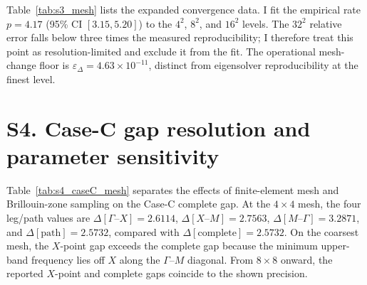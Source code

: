 \documentclass[pdflatex,sn-basic,Numbered]{sn-jnl}
\begin{document}
\begin{table}[htbp]
\caption{Expanded mesh-convergence data, including successive changes and eigensolver reproducibility}
\label{tab:s3_mesh}

\end{table}

Table~\ref{tab:s3_mesh} lists the expanded convergence data. I fit the empirical rate $p=4.17$ (95\% CI $[3.15,5.20]$) to the $4^2$, $8^2$, and $16^2$ levels. The $32^2$ relative error falls below three times the measured reproducibility; I therefore treat this point as resolution-limited and exclude it from the fit. The operational mesh-change floor is $\varepsilon_\Delta=4.63\times10^{-11}$, distinct from eigensolver reproducibility at the finest level.

\section*{S4. Case-C gap resolution and parameter sensitivity}
Table~\ref{tab:s4_caseC_mesh} separates the effects of finite-element mesh and Brillouin-zone sampling on the Case-C complete gap. At the $4\times4$ mesh, the four leg/path values are $\Delta[\Gamma\text{--}X]=2.6114$, $\Delta[X\text{--}M]=2.7563$, $\Delta[M\text{--}\Gamma]=3.2871$, and $\Delta[\mathrm{path}]=2.5732$, compared with $\Delta[\mathrm{complete}]=2.5732$. On the coarsest mesh, the $X$-point gap exceeds the complete gap because the minimum upper-band frequency lies off $X$ along the $\Gamma$--$M$ diagonal. From $8\times8$ onward, the reported $X$-point and complete gaps coincide to the shown precision.

\begin{table}[htbp]
\caption{Case-C complete-gap and $X$-point gap values under mesh refinement}
\label{tab:s4_caseC_mesh}

\end{table}
\end{document}
